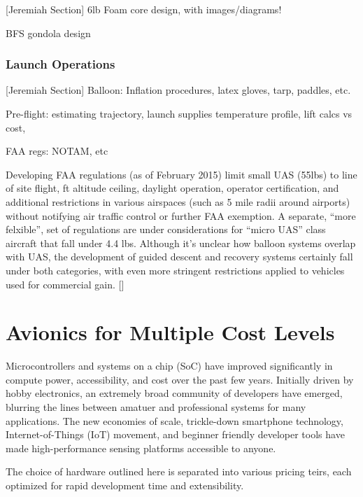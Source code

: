 \documentclass[heading.tex]{subfiles}
\begin{document}
[Jeremiah Section]
\<6lb Foam core design, with images/diagrams!

BFS gondola design

\subsubsection{Launch Operations}

[Jeremiah Section]
Balloon: Inflation procedures, latex gloves, tarp, paddles, etc.

Pre-flight: estimating trajectory, launch supplies
temperature profile, lift calcs vs cost, 

FAA regs: NOTAM, etc

Developing FAA regulations (as of February 2015) limit small UAS (\<55lbs) to
line of site flight,  ft altitude ceiling, daylight operation, operator certification,
and additional restrictions in various airspaces (such as 5 mile radii around airports)
without notifying air traffic control or further FAA exemption.
A separate, ``more felxible'', set of regulations are under considerations
for ``micro UAS'' class aircraft that fall under 4.4 lbs.
Although it's unclear how balloon systems overlap with UAS, the development
of guided descent and recovery systems certainly fall under both categories,
with even more stringent restrictions applied to vehicles used for commercial gain.
[\cite{FAAuav}]


\section{Avionics for Multiple Cost Levels}

Microcontrollers and systems on a chip (SoC) have improved significantly in 
compute power, accessibility, and cost over the past few years.
Initially driven by hobby electronics, an extremely broad community of developers
have emerged, blurring the lines between amatuer and professional systems for
many applications. The new economies of scale, trickle-down smartphone
technology, Internet-of-Things (IoT) movement, and beginner friendly developer
tools have made high-performance sensing platforms accessible to anyone.

The choice of hardware outlined here is separated into various pricing teirs,
each optimized for rapid development time and extensibility.
\end{document}
